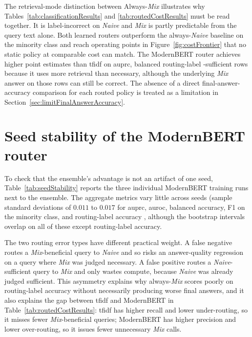\documentclass[english, bibtex]{kththesis}               %
\numberwithin{listing}{chapter}
\providecommand{\DIFaddtex}[1]{{\protect\color{blue} \sf #1}} %
\providecommand{\DIFdeltex}[1]{{\protect\color{red} \scriptsize #1}} %
\providecommand{\DIFaddbegin}{} %
\providecommand{\DIFaddend}{} %
\providecommand{\DIFdelbegin}{} %
\providecommand{\DIFdelend}{} %
\providecommand{\DIFadd}[1]{\texorpdfstring{\DIFaddtex{#1}}{#1}} %
\providecommand{\DIFdel}[1]{\texorpdfstring{\DIFdeltex{#1}}{}} %
\begin{document}
\DIFdel{The retrieval-mode distinction between }\DIFdelend \DIFaddbegin \DIFadd{Always-\emph{Mix} illustrates why Tables~\ref{tab:classificationResults} and \ref{tab:routedCostResults} must be read together. It is label-incorrect on }\DIFaddend \emph{Naive}\DIFdelbegin \DIFdel{and \emph{Mix} is partly predictable from the query text alone. Both learned routers outperform the always-\emph{Naive} baseline on the minority class and reach operating points in Figure~\ref{fig:costFrontier} that no static policy at comparable cost can match. The ModernBERT router achieves higher point estimates than \gls{tfidf} on \gls{auprc}, balanced routing-label }\DIFdelend \DIFaddbegin \DIFadd{-sufficient rows because it uses more retrieval than necessary, although the underlying \emph{Mix} answer on those rows can still be correct. The absence of a direct final-answer-accuracy comparison for each routed policy is treated as a limitation in Section~\ref{sec:limitFinalAnswerAccuracy}.
}

\section{Seed stability of the ModernBERT router}
\label{sec:resultsSeeds}

\DIFadd{To check that the ensemble's advantage is not an artifact of one seed, Table~\ref{tab:seedStability} reports the three individual ModernBERT training runs next to the ensemble. The aggregate metrics vary little across seeds (sample standard deviations of $0.011$ to $0.017$ for \gls{auprc}, \gls{auroc}, balanced }\DIFaddend accuracy, F1\DIFdelbegin \DIFdel{on the minority class}\DIFdelend , and routing-label accuracy\DIFdelbegin \DIFdel{, although the bootstrap intervals overlap on all of these except routing-label accuracy. }%

\DIFdel{The two routing error types have different practical weight. A false negative routes a \emph{Mix}-beneficial query to \emph{Naive} and so risks an answer-quality regression on a query where \emph{Mix} was judged necessary. A false positive routes a \emph{Naive}-sufficient query to \emph{Mix} and only wastes compute, because \emph{Naive} was already judged sufficient. This asymmetry explains why always-\emph{Mix} scores poorly on routing-label accuracy without necessarily producing worse final answers, and it also explains the gap between \gls{tfidf} and ModernBERT in Table~\ref{tab:routedCostResults}: \gls{tfidf} has higher recall and lower under-routing, so it misses fewer \emph{Mix}-beneficial queries; ModernBERT has higher precision and lower over-routing, so it issues fewer unnecessary \emph{Mix} calls.
}%
\end{document}
